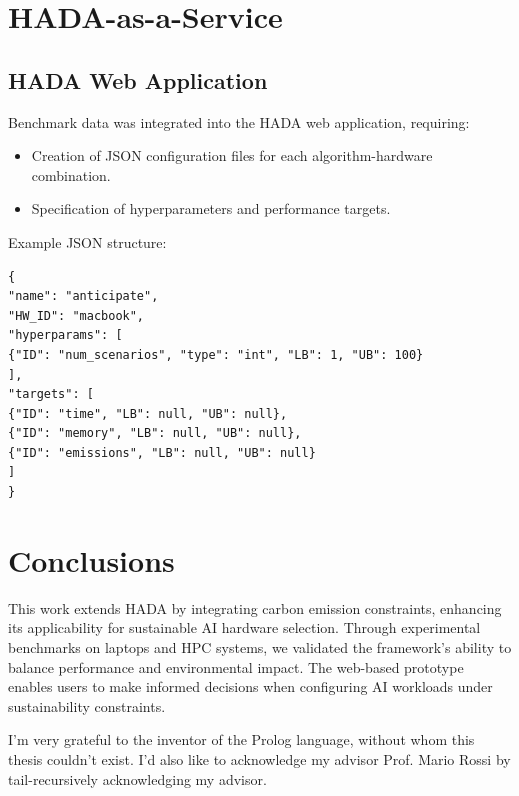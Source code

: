 \documentclass[a4paper,singleside,12pt]{report} %
\begin{document}
\chapter{HADA-as-a-Service}

\section{HADA Web Application}
Benchmark data was integrated into the HADA web application, requiring:
\begin{itemize}
\item Creation of JSON configuration files for each algorithm-hardware combination.
\item Specification of hyperparameters and performance targets.
\end{itemize}

Example JSON structure:
\begin{verbatim}
{
"name": "anticipate",
"HW_ID": "macbook",
"hyperparams": [
{"ID": "num_scenarios", "type": "int", "LB": 1, "UB": 100}
],
"targets": [
{"ID": "time", "LB": null, "UB": null},
{"ID": "memory", "LB": null, "UB": null},
{"ID": "emissions", "LB": null, "UB": null}
]
}
\end{verbatim}

\chapter{Conclusions}

This work extends HADA by integrating carbon emission constraints, enhancing its applicability 
for sustainable AI hardware selection. Through experimental benchmarks on laptops and HPC systems, 
we validated the framework’s ability to balance performance and environmental impact. The web-based prototype 
enables users to make informed decisions when configuring AI workloads under sustainability constraints.

\appendix

\printbibliography[heading=bibintoc] %

\acknowledgements
I'm very grateful to the inventor of the Prolog language, without whom this thesis couldn't exist. I'd also like 
to acknowledge my advisor Prof. Mario Rossi by tail-recursively acknowledging my advisor.
	
\end{document}
